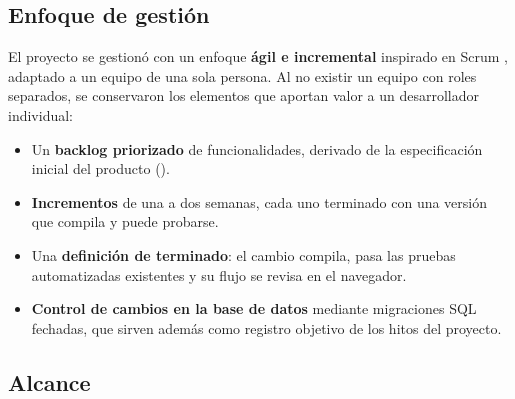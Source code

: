 \documentclass[11pt]{article}
\begin{document}
\subsection{Enfoque de gestión}

El proyecto se gestionó con un enfoque \textbf{ágil e incremental} inspirado en Scrum \parencite{schwaber2020}, adaptado a un equipo de una sola persona. Al no existir un equipo con roles separados, se conservaron los elementos que aportan valor a un desarrollador individual:

\begin{itemize}
  \item Un \textbf{backlog priorizado} de funcionalidades, derivado de la especificación inicial del producto ().
  \item \textbf{Incrementos} de una a dos semanas, cada uno terminado con una versión que compila y puede probarse.
  \item Una \textbf{definición de terminado}: el cambio compila, pasa las pruebas automatizadas existentes y su flujo se revisa en el navegador.
  \item \textbf{Control de cambios en la base de datos} mediante migraciones SQL fechadas, que sirven además como registro objetivo de los hitos del proyecto.
\end{itemize}

\subsection{Alcance}
\end{document}

